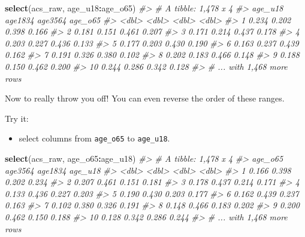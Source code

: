 \documentclass[
]{book}
\newenvironment{Shaded}{\begin{snugshade}}{\end{snugshade}}
\newcommand{\CommentTok}[1]{\textcolor[rgb]{0.56,0.35,0.01}{\textit{#1}}}
\newcommand{\KeywordTok}[1]{\textcolor[rgb]{0.13,0.29,0.53}{\textbf{#1}}}
\newcommand{\NormalTok}[1]{#1}
\newcommand{\OperatorTok}[1]{\textcolor[rgb]{0.81,0.36,0.00}{\textbf{#1}}}
\providecommand{\tightlist}{%
  \setlength{\itemsep}{0pt}\setlength{\parskip}{0pt}}
\begin{document}
\begin{Shaded}
\begin{Highlighting}[]
\KeywordTok{select}\NormalTok{(acs\_raw, age\_u18}\OperatorTok{:}\NormalTok{age\_o65)}
\CommentTok{\#\textgreater{} \# A tibble: 1,478 x 4}
\CommentTok{\#\textgreater{}    age\_u18 age1834 age3564 age\_o65}
\CommentTok{\#\textgreater{}      \textless{}dbl\textgreater{}   \textless{}dbl\textgreater{}   \textless{}dbl\textgreater{}   \textless{}dbl\textgreater{}}
\CommentTok{\#\textgreater{}  1   0.234   0.202   0.398   0.166}
\CommentTok{\#\textgreater{}  2   0.181   0.151   0.461   0.207}
\CommentTok{\#\textgreater{}  3   0.171   0.214   0.437   0.178}
\CommentTok{\#\textgreater{}  4   0.203   0.227   0.436   0.133}
\CommentTok{\#\textgreater{}  5   0.177   0.203   0.430   0.190}
\CommentTok{\#\textgreater{}  6   0.163   0.237   0.439   0.162}
\CommentTok{\#\textgreater{}  7   0.191   0.326   0.380   0.102}
\CommentTok{\#\textgreater{}  8   0.202   0.183   0.466   0.148}
\CommentTok{\#\textgreater{}  9   0.188   0.150   0.462   0.200}
\CommentTok{\#\textgreater{} 10   0.244   0.286   0.342   0.128}
\CommentTok{\#\textgreater{} \# ... with 1,468 more rows}
\end{Highlighting}
\end{Shaded}

Now to really throw you off! You can even reverse the order of these ranges.

Try it:

\begin{itemize}
\tightlist
\item
  select columns from \texttt{age\_o65} to \texttt{age\_u18}.
\end{itemize}

\begin{Shaded}
\begin{Highlighting}[]
\KeywordTok{select}\NormalTok{(acs\_raw, age\_o65}\OperatorTok{:}\NormalTok{age\_u18)}
\CommentTok{\#\textgreater{} \# A tibble: 1,478 x 4}
\CommentTok{\#\textgreater{}    age\_o65 age3564 age1834 age\_u18}
\CommentTok{\#\textgreater{}      \textless{}dbl\textgreater{}   \textless{}dbl\textgreater{}   \textless{}dbl\textgreater{}   \textless{}dbl\textgreater{}}
\CommentTok{\#\textgreater{}  1   0.166   0.398   0.202   0.234}
\CommentTok{\#\textgreater{}  2   0.207   0.461   0.151   0.181}
\CommentTok{\#\textgreater{}  3   0.178   0.437   0.214   0.171}
\CommentTok{\#\textgreater{}  4   0.133   0.436   0.227   0.203}
\CommentTok{\#\textgreater{}  5   0.190   0.430   0.203   0.177}
\CommentTok{\#\textgreater{}  6   0.162   0.439   0.237   0.163}
\CommentTok{\#\textgreater{}  7   0.102   0.380   0.326   0.191}
\CommentTok{\#\textgreater{}  8   0.148   0.466   0.183   0.202}
\CommentTok{\#\textgreater{}  9   0.200   0.462   0.150   0.188}
\CommentTok{\#\textgreater{} 10   0.128   0.342   0.286   0.244}
\CommentTok{\#\textgreater{} \# ... with 1,468 more rows}
\end{Highlighting}
\end{Shaded}
\end{document}

